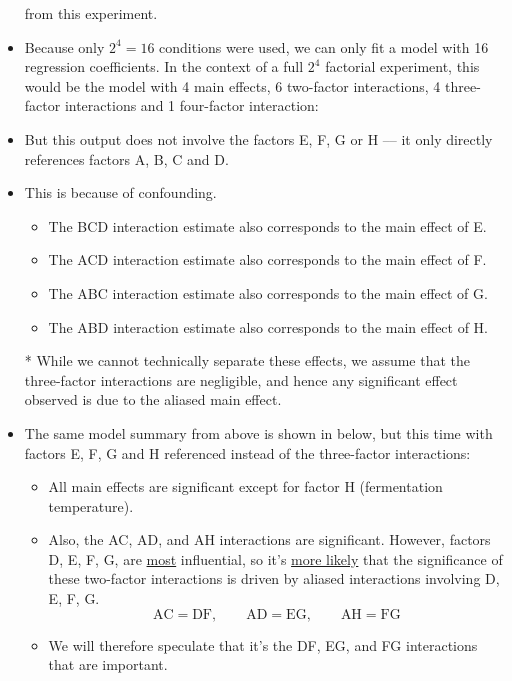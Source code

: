 \begin{itemize}
          from this experiment.
    \item Because only $2^4=16$ conditions were used, we can only fit a model with 16 regression coefficients. In
          the context of a full $2^4$ factorial experiment, this would be the model with 4 main effects, 6 two-factor
          interactions, 4 three-factor interactions and 1 four-factor interaction:
          
    \item But this output does not involve the factors E, F, G or H –-- it only directly references factors A, B, C
          and D.
    \item This is because of confounding.
          \begin{itemize}
              \item The BCD interaction estimate also corresponds to the main effect of E.
              \item The ACD interaction estimate also corresponds to the main effect of F.
              \item The ABC interaction estimate also corresponds to the main effect of G.
              \item The ABD interaction estimate also corresponds to the main effect of H.
          \end{itemize}
    \item[*] While we cannot technically separate these effects, we assume that the three-factor interactions are
        negligible, and hence any significant effect observed is due to the aliased main effect.
    \item The same model summary from above is shown in below, but this time with factors E, F, G and H
          referenced instead of the three-factor interactions:
          
          \begin{itemize}[*]
              \item All main effects are significant except for factor H (fermentation temperature).
              \item Also, the AC, AD, and AH interactions are significant. However, factors D, E, F, G, are \underline{most}
                    influential, so it's \underline{more likely} that the significance of these two-factor interactions is driven by aliased
                    interactions involving D, E, F, G.
                    \[ \text{AC}=\text{DF},\qquad\text{AD}=\text{EG},\qquad\text{AH}=\text{FG} \]
              \item We will therefore speculate that it's the DF, EG, and FG interactions that are important.

\end{itemize}
\end{itemize}
